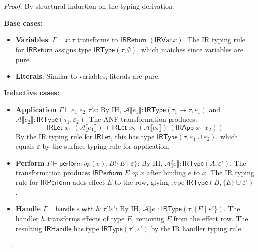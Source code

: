 \begin{proof}
By structural induction on the typing derivation.

\textbf{Base cases:}
\begin{itemize}
  \item \textbf{Variables}: $\Gamma \vdash x : \tau$ transforms to $\mathsf{IRReturn}\;(\mathsf{IRVar}\; x)$. The IR typing rule for $\mathsf{IRReturn}$ assigns type $\mathsf{IRType}(\tau, \emptyset)$, which matches since variables are pure.

  \item \textbf{Literals}: Similar to variables; literals are pure.
\end{itemize}

\textbf{Inductive cases:}
\begin{itemize}
  \item \textbf{Application} $\Gamma \vdash e_1\; e_2 : \tau \mathbin{!} \varepsilon$:
  By IH, $\mathcal{A}\llbracket e_1 \rrbracket : \mathsf{IRType}(\tau_1 \to \tau, \varepsilon_1)$ and $\mathcal{A}\llbracket e_2 \rrbracket : \mathsf{IRType}(\tau_1, \varepsilon_2)$.
  The ANF transformation produces:
  \[
  \mathsf{IRLet}\; x_1\; (\mathcal{A}\llbracket e_1 \rrbracket)\; (\mathsf{IRLet}\; x_2\; (\mathcal{A}\llbracket e_2 \rrbracket)\; (\mathsf{IRApp}\; x_1\; x_2))
  \]
  By the IR typing rule for $\mathsf{IRLet}$, this has type $\mathsf{IRType}(\tau, \varepsilon_1 \cup \varepsilon_2)$, which equals $\varepsilon$ by the surface typing rule for application.

  \item \textbf{Perform} $\Gamma \vdash \mathsf{perform}\; \mathit{op}(e) : B \mathbin{!} \{E \mid \varepsilon\}$:
  By IH, $\mathcal{A}\llbracket e \rrbracket : \mathsf{IRType}(A, \varepsilon')$.
  The transformation produces $\mathsf{IRPerform}\; E\; \mathit{op}\; x$ after binding $e$ to $x$.
  The IR typing rule for $\mathsf{IRPerform}$ adds effect $E$ to the row, giving type $\mathsf{IRType}(B, \{E\} \cup \varepsilon')$.

  \item \textbf{Handle} $\Gamma \vdash \mathsf{handle}\; e\; \mathsf{with}\; h : \tau' \mathbin{!} \varepsilon'$:
  By IH, $\mathcal{A}\llbracket e \rrbracket : \mathsf{IRType}(\tau, \{E \mid \varepsilon'\})$.
  The handler $h$ transforms effects of type $E$, removing $E$ from the effect row.
  The resulting $\mathsf{IRHandle}$ has type $\mathsf{IRType}(\tau', \varepsilon')$ by the IR handler typing rule.
\end{itemize}


\end{proof}
